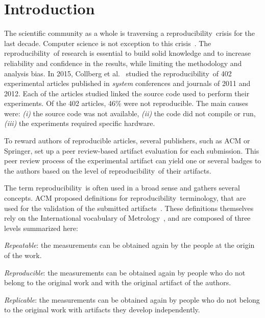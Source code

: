 \documentclass[sigconf,natbib=false]{acmart}
\newcommand{\repro}{reproducibility}
\begin{document}

\section{Introduction}

The scientific community as a whole is traversing a \repro\ crisis for the last decade.
Computer science is not exception to this crisis\ \cite{randallIrreproducibilityCrisisModern2018,baker500ScientistsLift2016}.
The \repro\ of research is essential to build solid knowledge and to increase reliability and confidence in the results, while limiting the methodology and analysis bias.
In 2015, Collberg et al.\ \cite{collberg_repeatability_2015} studied the \repro\ of 402 experimental articles published in \emph{system} conferences and journals of 2011 and 2012.
Each of the articles studied linked the source code used to perform their experiments. 
Of the 402 articles, 46\% were not reproducible.
The main causes were:
\emph{(i)} the source code was not available,
\emph{(ii)} the code did not compile or run,
\emph{(iii)} the experiments required specific hardware.

To reward authors of reproducible articles, several publishers, such as ACM or Springer, set up a peer review-based artifact evaluation for each submission.
This peer review process of the experimental artifact can yield one or several badges to the authors based on the level of \repro\ of their artifacts.

The term \repro\ is often used in a broad sense and gathers several concepts.
ACM proposed definitions for \repro\ terminology, that are used for the validation of the submitted artifacts\ \cite{acm-badges}.
These definitions themselves rely on the International vocabulary of Metrology\ \cite{defs_vim}, and are composed of three levels summarized here:
\begin{enumerate*}[label=(\roman*)]
  \item \emph{Repeatable}: the measurements can be obtained again by the people at the origin of the work.
\item \emph{Reproducible}: the measurements can be obtained again by people who do not belong to the original work and with the original artifact of the authors.
\item \emph{Replicable}: the measurements can be obtained again by people who do not belong to the original work with artifacts they develop independently.
\end{enumerate*}
\end{document}
